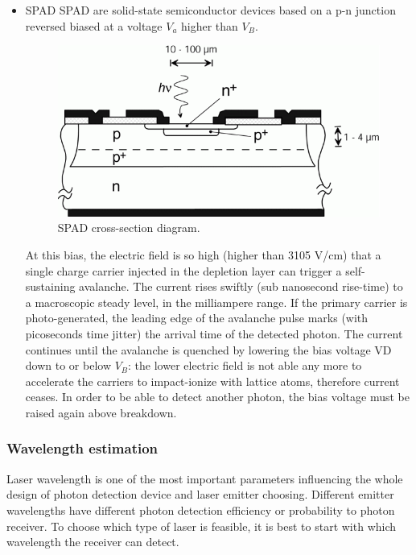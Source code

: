 \begin{itemize}
\item \acs{SPAD}
\ac{SPAD} are solid-state semiconductor devices based on a p-n junction reversed biased at a voltage $V_{a}$ higher than $V_{B}$.

\begin{figure}[ht!]
\centering
\includegraphics[scale = 0.7]{chapters/img/SPAD_Cross-section.png}
\caption{\acs{SPAD} cross-section diagram.}
\label{fig:SPAD_cross-section}
\end{figure}

At this bias, the electric field is so high (higher than 3105 V/cm) that a single charge carrier injected in the depletion layer can trigger a self-sustaining avalanche. The current rises swiftly (sub nanosecond rise-time) to a macroscopic steady level, in the milliampere range. If the primary carrier is photo-generated, the leading edge of the avalanche pulse marks (with picoseconds time jitter) the arrival time of the detected photon. The current continues until the avalanche is quenched by lowering the bias voltage VD down to or below $V_{B}$: the lower electric field is not able any more to accelerate the carriers to impact-ionize with lattice atoms, therefore current ceases. In order to be able to detect another photon, the bias voltage must be raised again above breakdown.\cite{SPAD_intro}

\end{itemize}


\subsubsection{Wavelength estimation}
\label{introReceiver}
Laser wavelength is one of the most important parameters influencing the whole design of photon detection device and \acs{laser} emitter choosing. Different emitter wavelengths have different photon detection efficiency or probability to photon receiver. To choose which type of \acs{laser} is feasible, it is best to start with which wavelength the receiver can detect.

